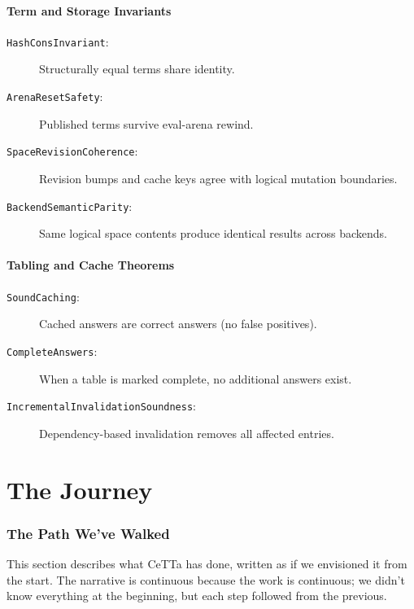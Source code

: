 \documentclass[11pt]{article}
\newcommand{\code}[1]{\texttt{#1}}
\newcommand{\CeTTa}{\textup{CeTTa}}
\begin{document}
\subsection{Term and Storage Invariants}

\begin{description}
\item[\code{HashConsInvariant}:]
  Structurally equal terms share identity.
\item[\code{ArenaResetSafety}:]
  Published terms survive eval-arena rewind.
\item[\code{SpaceRevisionCoherence}:]
  Revision bumps and cache keys agree with logical mutation boundaries.
\item[\code{BackendSemanticParity}:]
  Same logical space contents produce identical results across backends.
\end{description}

\subsection{Tabling and Cache Theorems}

\begin{description}
\item[\code{SoundCaching}:]
  Cached answers are correct answers (no false positives).
\item[\code{CompleteAnswers}:]
  When a table is marked complete, no additional answers exist.
\item[\code{IncrementalInvalidationSoundness}:]
  Dependency-based invalidation removes all affected entries.
\end{description}

\part{The Journey}

\section{The Path We've Walked}
\label{sec:journey}

This section describes what \CeTTa{} has done, written as if we
envisioned it from the start.  The narrative is continuous because
the work is continuous; we didn't know everything at the beginning,
but each step followed from the previous.
\end{document}
